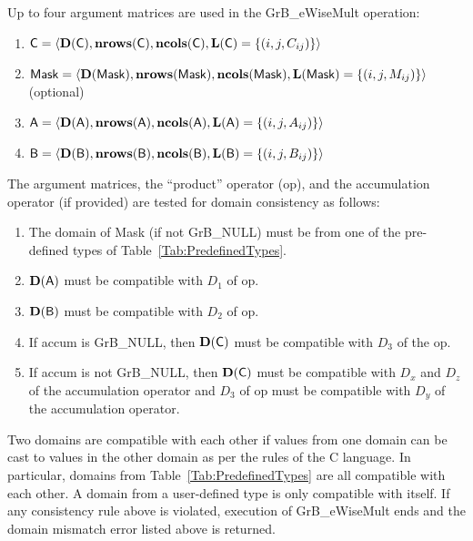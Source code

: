 Up to four argument matrices are used in the {\sf GrB\_eWiseMult} operation:
\begin{enumerate}
	\item ${\sf C} = \langle \bold{D}({\sf C}),\bold{nrows}({\sf C}),\bold{ncols}({\sf C}),\bold{L}({\sf C}) = \{(i,j,C_{ij}) \} \rangle$
	\item ${\sf Mask} = \langle \bold{D}({\sf Mask}),\bold{nrows}({\sf Mask}),\bold{ncols}({\sf Mask}),\bold{L}({\sf Mask}) = \{(i,j,M_{ij}) \} \rangle$ (optional)
	\item ${\sf A} = \langle \bold{D}({\sf A}),\bold{nrows}({\sf A}), \bold{ncols}({\sf A}),\bold{L}({\sf A}) = \{(i,j,A_{ij}) \} \rangle$
	\item ${\sf B} = \langle \bold{D}({\sf B}),\bold{nrows}({\sf B}), \bold{ncols}({\sf B}),\bold{L}({\sf B}) = \{(i,j,B_{ij}) \} \rangle$
\end{enumerate}

The argument matrices, the ``product'' operator ({\sf op}), and the accumulation 
operator (if provided) are tested for domain consistency as follows:
\begin{enumerate}
	\item The domain of {\sf Mask} (if not {\sf GrB\_NULL}) must be from one of the pre-defined types of Table~\ref{Tab:PredefinedTypes}.

	\item $\bold{D}({\sf A})$ must be compatible with $D_1$ of {\sf op}.

	\item $\bold{D}({\sf B})$ must be compatible with $D_2$ of {\sf op}.

	\item If {\sf accum} is {\sf GrB\_NULL}, then $\bold{D}({\sf C})$ must be 
    compatible with $D_3$ of the {\sf op}.

	\item If {\sf accum} is not {\sf GrB\_NULL}, then $\bold{D}({\sf C})$ must be
    compatible with $D_x$ and $D_z$ of the accumulation operator and $D_3$ of
    {\sf op} must be compatible with $D_y$ of the accumulation operator.
\end{enumerate}
Two domains are compatible with each other if values from one domain can be cast 
to values in the other domain as per the rules of the C language.
In particular, domains from Table~\ref{Tab:PredefinedTypes} are all compatible 
with each other. A domain from a user-defined type is only compatible with itself.
If any consistency rule above is violated, execution of {\sf GrB\_eWiseMult} ends
and the domain mismatch error listed above is returned.


